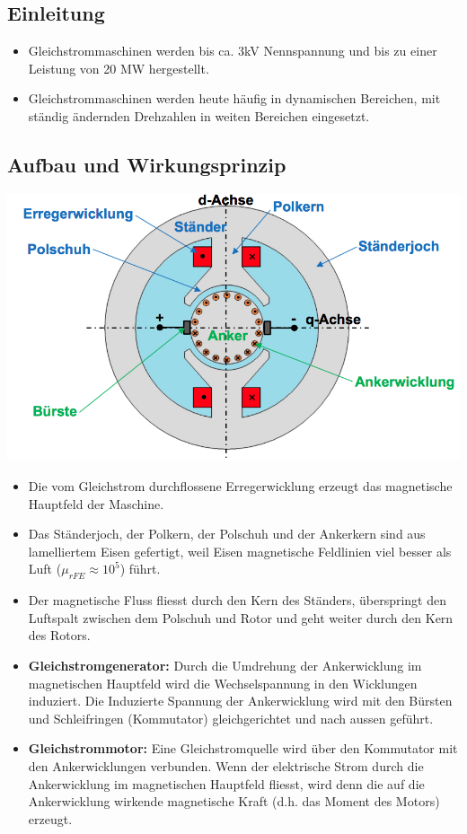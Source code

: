 \subsection{Einleitung}
\begin{itemize}
\item Gleichstrommaschinen werden bis ca. 3kV Nennspannung und bis zu einer Leistung von 20 MW hergestellt.
\item Gleichstrommaschinen werden heute häufig in dynamischen Bereichen, mit ständig ändernden Drehzahlen in weiten Bereichen eingesetzt.
\end{itemize}

\subsection{Aufbau und Wirkungsprinzip}
\begin{minipage}{0.5 \linewidth}
\includegraphics[width = \linewidth]{./Pics/VL45/GSMAufbau}
\end{minipage}
\begin{minipage}{0.5 \linewidth}
\begin{itemize}
\item Die vom Gleichstrom durchflossene Erregerwicklung erzeugt das magnetische Hauptfeld der Maschine.
\item Das Ständerjoch, der Polkern, der Polschuh und der Ankerkern sind aus lamelliertem Eisen gefertigt, weil Eisen magnetische Feldlinien viel besser als Luft ($\mu_{rFE} \approx 10^5$) führt. 
\item Der magnetische Fluss fliesst durch den Kern des Ständers, überspringt den Luftspalt zwischen dem Polschuh und Rotor und geht weiter durch den Kern des Rotors.
\item \textbf{Gleichstromgenerator:} Durch die Umdrehung der Ankerwicklung im magnetischen Hauptfeld wird die Wechselspannung in den Wicklungen induziert. Die Induzierte Spannung der Ankerwicklung wird mit den Bürsten und Schleifringen (Kommutator) gleichgerichtet und nach aussen geführt.
\item \textbf{Gleichstrommotor:} Eine Gleichstromquelle wird über den Kommutator mit den Ankerwicklungen verbunden. Wenn der elektrische Strom durch die Ankerwicklung im magnetischen Hauptfeld fliesst, wird denn die auf die Ankerwicklung wirkende magnetische Kraft (d.h. das Moment des Motors) erzeugt. 
\end{itemize}
\end{minipage}

